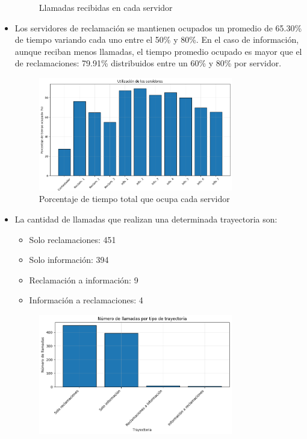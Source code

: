 \documentclass[12pt]{article}
\begin{document}
\begin{itemize}
\begin{figure}[H]
        \caption{Llamadas recibidas en cada servidor}
        \label{fig: Llamadas recibidas en cada servidor}
    \end{figure}
    \item Los servidores de reclamación se mantienen ocupados un promedio de 65.30\% de tiempo variando cada uno entre el 50\% y 80\%. En el caso de información, aunque reciban menos llamadas, el tiempo promedio ocupado es mayor que el de reclamaciones: 79.91\% distribuidos entre un 60\% y 80\% por servidor.
    \begin{figure}[H]
        \centering
        \includegraphics[width=0.8\textwidth]{server_utilization.png}
        \caption{Porcentaje de tiempo total que ocupa cada servidor}
        \label{fig: Porcentaje de tiempo total que ocupa cada servidor}
    \end{figure}
    \item La cantidad de llamadas que realizan una determinada trayectoria son:
    \begin{itemize}
        \item Solo reclamaciones: 451
        \item Solo información: 394
        \item Reclamación a información: 9
        \item Información a reclamaciones: 4
    \end{itemize}
    \begin{figure}[H]
        \centering
        \includegraphics[width=0.8\textwidth]{trajectories.png}

\end{figure}
\end{itemize}
\end{document}
